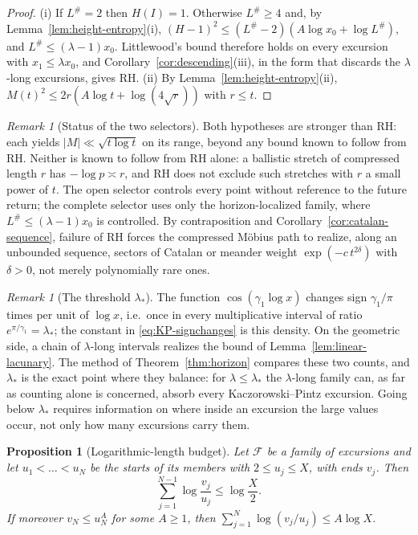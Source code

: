 \documentclass[11pt]{amsart}
\numberwithin{equation}{section}
\theoremstyle{plain}
\newtheorem{proposition}[theorem]{Proposition}
\theoremstyle{definition}
\theoremstyle{remark}
\newtheorem{remark}[theorem]{Remark}
\newcommand{\F}{\mathcal{F}}
\begin{document}
\begin{proof}
(i) If $L^\#=2$ then $H(I)=1$. Otherwise $L^\#\ge4$ and, by
Lemma~\ref{lem:height-entropy}(i), $(H-1)^2\le(L^\#-2)(A\log x_0+\log L^\#)$, and $L^\#\le(\lambda-1)x_0$.
Littlewood's bound therefore holds on every excursion with
$x_1\le\lambda x_0$, and Corollary~\ref{cor:descending}(iii), in the form
that discards the $\lambda$-long excursions, gives RH.
(ii) By Lemma~\ref{lem:height-entropy}(ii),
$M(t)^2\le2r(A\log t+\log(4\sqrt r))$ with $r\le t$.
\end{proof}

\begin{remark}[Status of the two selectors]
\label{rem:selector-status}
Both hypotheses are stronger than RH: each yields $|M|\ll\sqrt{t\log t}$ on
its range, beyond any bound known to follow from RH. Neither is known to follow
from RH alone: a ballistic stretch of compressed length $r$ has $-\log p\asymp r$,
and RH does not exclude such stretches with $r$ a small power of $t$. The open selector controls every point without reference
to the future return; the complete selector uses only the horizon-localized
family, where $L^\#\le(\lambda-1)x_0$ is controlled. By contraposition and
Corollary~\ref{cor:catalan-sequence}, failure of RH forces the compressed
M\"obius path to realize, along an unbounded sequence, sectors of Catalan or
meander weight $\exp(-c\,t^{2\delta})$ with $\delta>0$, not merely
polynomially rare ones.
\end{remark}





\begin{remark}[The threshold $\lambda_*$]
\label{rem:lambda-star}
The function $\cos(\gamma_1\log x)$ changes sign $\gamma_1/\pi$ times per
unit of $\log x$, i.e.\ once in every multiplicative interval of ratio
$e^{\pi/\gamma_1}=\lambda_*$; the constant in \eqref{eq:KP-signchanges} is
this density. On the geometric side, a chain of $\lambda$-long intervals
realizes the bound of Lemma~\ref{lem:linear-lacunary}. The method of
Theorem~\ref{thm:horizon} compares these two counts, and $\lambda_*$ is the
exact point where they balance: for $\lambda\le\lambda_*$ the $\lambda$-long
family can, as far as counting alone is concerned, absorb every
Kaczorowski--Pintz excursion. Going below $\lambda_*$ requires information
on where inside an excursion the large values occur, not only how many
excursions carry them.
\end{remark}

\begin{proposition}[Logarithmic-length budget]
\label{prop:log-budget}
Let $\F$ be a family of excursions and let $u_1<\dots<u_N$ be the starts of
its members with $2\le u_j\le X$, with ends $v_j$. Then
\[
\sum_{j=1}^{N-1}\log\frac{v_j}{u_j}\le\log\frac X2 .
\]
If moreover $v_N\le u_N^A$ for some $A\ge1$, then
$\sum_{j=1}^{N}\log(v_j/u_j)\le A\log X$.
\end{proposition}
\end{document}

